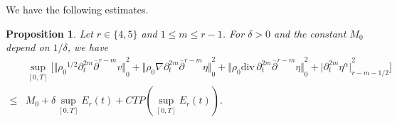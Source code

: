 \documentclass[12pt,twoside,reqno]{amsart}
\numberwithin{equation}{section}
\newtheorem{proposition}[theorem]{Proposition}
\theoremstyle{definition}
\theoremstyle{remark}
\begin{document}
We have the following estimates.

\begin{proposition}\label{prop.mix1}
  Let $r\in\{4,5\}$ and $1{\leqslant} m{\leqslant} r-1$. For $\delta>0$ and the constant $M_0$ depend on $1/\delta$, we have
  \begin{align*}
    &\sup_{[0,T]}\Big[{\Vert{{\rho_0}^{1/2}{\partial}_t^{2m}{\overline{\partial}}^{r-m} v}\Vert}_0^2+{\Vert{{\rho_0} {\nabla}{\partial}_t^{2m}{\overline{\partial}}^{r-m}\eta}\Vert}_0^2 +{\Vert{{\rho_0} {\mathrm{div}\,}{\partial}_t^{2m}{\overline{\partial}}^{r-m}\eta}\Vert}_0^2+{\vert{{\partial}_t^{2m}\eta^\alpha}\vert}_{r-m-1/2}^2\Big]\\
    {\leqslant} & M_0+\delta\sup_{[0,T]}E_r(t)+CTP(\sup_{[0,T]}E_r(t)).
  \end{align*}
\end{proposition}
\end{document}
